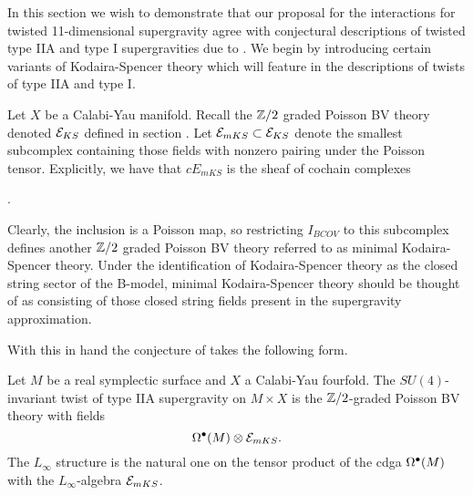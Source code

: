 In this section we wish to demonstrate that our proposal for the interactions for twisted 11-dimensional supergravity agree with conjectural descriptions of twisted type IIA and type I supergravities due to \cite{CLSugra}. We begin by introducing certain variants of Kodaira-Spencer theory which will feature in the descriptions of twists of type IIA and type I.


Let $X$ be a Calabi-Yau manifold. Recall the $\mathbb{Z}/2$ graded Poisson BV theory denoted $\mathcal E_{KS}$ defined in section \surya{}. Let $\mathcal E_{{mKS}}\subset \mathcal E_{KS}$ denote the smallest subcomplex containing those fields with nonzero pairing under the Poisson tensor. Explicitly, we have that $cE_{mKS}$ is the sheaf of cochain complexes
\beqn
{}.
\eeqn

Clearly, the inclusion is a Poisson map, so restricting $I_{BCOV}$ to this subcomplex defines another $\mathbb{Z}/2$ graded Poisson BV theory referred to as minimal Kodaira-Spencer theory. Under the identification of Kodaira-Spencer theory as the closed string sector of the B-model, minimal Kodaira-Spencer theory should be thought of as consisting of those closed string fields present in the supergravity approximation.

With this in hand the conjecture of \cite{CLSugra} takes the following form.

\begin{conj}
  Let $M$ be a real symplectic surface and $X$ a Calabi-Yau fourfold. The $SU(4)$-invariant twist of type IIA supergravity on $M\times X$ is the $\mathbb{Z}/2$-graded Poisson BV theory with fields \[\Omega^{\bullet}(M)\otimes \mathcal E_{mKS}.\] The $L_{\infty}$ structure is the natural one on the tensor product of the cdga $\Omega^{\bullet}(M)$ with the $L_{\infty}$-algebra $\mathcal E_{mKS}$.
\end{conj}

